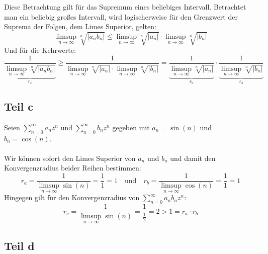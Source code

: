 \documentclass[a4paper,german,12pt,smallheadings]{scrartcl}
\begin{document}
Diese Betrachtung gilt für das Supremum eines beliebiges Intervall. Betrachtet man ein beliebig großes Intervall, wird logischerweise für den Grenzwert der Suprema der Folgen, dem Limes Superior, gelten: 
\begin{equation*}
\limsup\limits_{n \to \infty} \sqrt[n]{|a_n b_n|} \leq \limsup\limits_{n \to \infty} \sqrt[n]{|a_n|} \cdot \limsup\limits_{n \to \infty} \sqrt[n]{|b_n|}
\end{equation*}
Und für die Kehrwerte:
\begin{equation*}
\underbrace{\frac{1}{\limsup\limits_{n \to \infty} \sqrt[n]{|a_n b_n|}}}_{r_c} \geq \frac{1}{\limsup\limits_{n \to \infty} \sqrt[n]{|a_n|} \cdot \limsup\limits_{n \to \infty} \sqrt[n]{|b_n|}}= \underbrace{\frac{1}{\limsup\limits_{n \to \infty} \sqrt[n]{|a_n|}}}_{r_a} \cdot \underbrace{\frac{1}{\limsup\limits_{n \to \infty} \sqrt[n]{|b_n|}}}_{r_b}
\end{equation*}

\subsection*{Teil c}

Seien $\sum\limits_{n=0}^{\infty} a_nz^n$ und $\sum\limits_{n=0}^{\infty} b_n z^n$ gegeben mit $a_n=\sin(n)$ und $b_n=\cos(n)$.\\
\\
Wir können sofort den Limes Superior von $a_n$ und $b_n$ und damit den Konvergenzradius beider Reihen bestimmen:
\begin{equation*}
r_a=\frac{1}{\limsup\limits_{n \to \infty} \sin(n)}=\frac{1}{1}=1 \quad \text{und} \quad r_b=\frac{1}{\limsup\limits_{n \to \infty} \cos(n)}=\frac{1}{1}=1
\end{equation*}
Hingegen gilt für den Konvergenzradius von $\sum\limits_{n=0}^{\infty} a_n b_n z^n$:
\begin{equation*}
r_c=\frac{1}{\limsup\limits_{n \to \infty} \sin(n)}=\frac{1}{\frac{1}{2}}=2>1=r_a \cdot r_b
\end{equation*}

\subsection*{Teil d}
\end{document}
